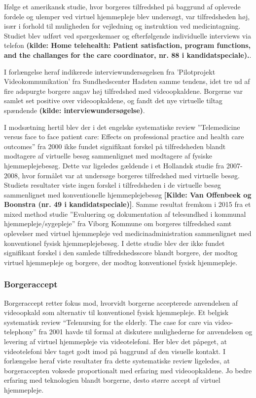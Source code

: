 Ifølge et amerikansk studie, hvor borgeres tilfredshed på baggrund af oplevede fordele og ulemper ved virtuel hjemmepleje blev undersøgt, var tilfredsheden høj, især i forhold til muligheden for vejledning og instruktion ved medicintagning. Studiet blev udført ved spørgeskemaer og efterfølgende individuelle interviews via telefon \textbf{(kilde: Home telehealth: Patient satisfaction, program functions, and the challanges for the care coordinator, nr. 88 i kandidatspeciale).}.

I forlængelse heraf indikerede interviewundersøgelsen fra ’Pilotprojekt Videokommunikation’ fra Sundhedscenter Hadsten samme tendens, idet tre ud af fire adspurgte borgere angav høj tilfredshed med videoopkaldene. Borgerne var samlet set positive over videoopkaldene, og fandt det nye virtuelle tiltag spændende \textbf{(kilde: interviewundersøgelse)}.

I modsætning hertil blev der i det engelske systematiske review ”Telemedicine versus face to face patient care: Effects on professional practice and health care outcomes” fra 2000 ikke fundet signifikant forskel på tilfredsheden blandt modtagere af virtuelle besøg sammenlignet med modtagere af fysiske hjemmeplejebesøg\cite{Paf2}. Dette var ligeledes gældende i et Hollandsk studie fra 2007-2008, hvor formålet var at undersøge borgeres tilfredshed med virtuelle besøg. Studiets resultater viste ingen forskel i tilfredsheden i de virtuelle besøg sammenlignet med konventionelle hjemmeplejebesøg \textbf{[Kilde: Van Offenbeek og Boonstra (nr. 49 i kandidatspeciale)]}. Samme resultat fremkom i 2015 fra et mixed method studie ”Evaluering og dokumentation af telesundhed i kommunal hjemmepleje/sygepleje” fra Viborg Kommune om borgeres tilfredshed samt oplevelser med virtuel hjemmepleje ved medicinadministration sammenlignet med konventionel fysisk hjemmeplejebesøg. I dette studie blev der ikke fundet signifikant forskel i den samlede tilfredshedsscore blandt borgere, der modtog virtuel hjemmepleje og borgere, der modtog konventionel fysisk hjemmepleje\cite{kandidat}.

\subsubsection{Borgeraccept}
Borgeraccept retter fokus mod, hvorvidt borgerne accepterede anvendelsen af videoopkald som alternativ til konventionel fysisk hjemmepleje. Et belgisk systematisk review “Telenursing for the elderly. The case for care via video-telephony” fra 2001 havde til formal at diskutere mulighederne for anvendelsen og levering af virtuel hjemmepleje via videotelefoni. Her blev det påpeget, at videotelefoni blev taget godt imod på baggrund af den visuelle kontakt\cite{telenursing}. I forlængelse heraf viste resultater fra dette systematiske review ligeledes, at borgeraccepten voksede proportionalt med erfaring med videoopkaldene. Jo bedre erfaring med teknologien blandt borgerne, desto større accept af virtuel hjemmepleje.

